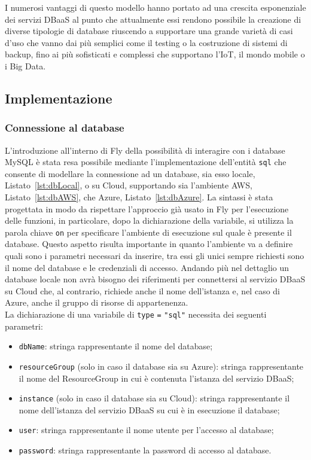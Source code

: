 I numerosi vantaggi di questo modello hanno portato ad una crescita esponenziale dei servizi DBaaS al punto che attualmente essi rendono possibile la creazione di diverse tipologie di database riuscendo a supportare una grande varietà di casi d’uso che vanno dai più semplici come il testing o la costruzione di sistemi di backup, fino ai più sofisticati e complessi che supportano l’IoT, il mondo mobile o i Big Data. \\

\subsection{Implementazione}
\subsubsection{Connessione al database}
L'introduzione all'interno di Fly della possibilità di interagire con i database MySQL è stata resa possibile mediante l'implementazione dell'entità \verb|sql| che consente di modellare la connessione ad un database, sia esso locale, Listato~\ref{lst:dbLocal}, o su Cloud, supportando sia l'ambiente AWS, Listato~\ref{lst:dbAWS}, che Azure, Listato~\ref{lst:dbAzure}. La sintassi è stata progettata in modo da rispettare l'approccio già usato in Fly per l'esecuzione delle funzioni, in particolare, dopo la dichiarazione della variabile, si utilizza la parola chiave \verb|on| per specificare l'ambiente di esecuzione sul quale è presente il database. Questo aspetto risulta importante in quanto l'ambiente va a definire quali sono i parametri necessari da inserire, tra essi gli unici sempre richiesti sono il nome del database e le credenziali di accesso. Andando più nel dettaglio un database locale non avrà bisogno dei riferimenti per connettersi al servizio DBaaS su Cloud che, al contrario, richiede anche il nome dell'istanza e, nel caso di Azure, anche il gruppo di risorse di appartenenza. \\
La dichiarazione di una variabile di \verb|type| \verb|=| \verb|"sql"| necessita dei seguenti parametri:

\begin{itemize}
    \item \verb|dbName|: stringa rappresentante il nome del database;
    \item \verb|resourceGroup| (solo in caso il database sia su Azure): stringa rappresentante il nome del ResourceGroup in cui è contenuta l'istanza del servizio DBaaS;
    \item \verb|instance| (solo in caso il database sia su Cloud): stringa rappresentante il nome dell'istanza del servizio DBaaS su cui è in esecuzione il database;
    \item \verb|user|: stringa rappresentante il nome utente per l'accesso al database;
    \item \verb|password|: stringa rappresentante la password di accesso al database.
\end{itemize}

